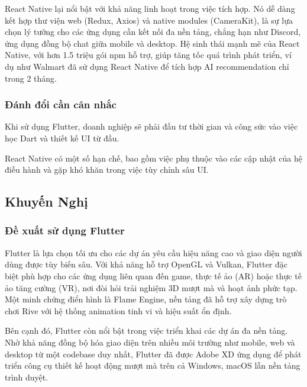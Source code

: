 \begin{flushleft}
    \hspace*{0.8cm}React Native lại nổi bật với khả năng linh hoạt trong việc tích hợp. Nó dễ dàng kết hợp thư viện web (Redux, Axios) và native modules (CameraKit), là sự lựa chọn lý tưởng cho các ứng dụng cần kết nối đa nền tảng, chẳng hạn như Discord, ứng dụng đồng bộ chat giữa mobile và desktop. Hệ sinh thái mạnh mẽ của React Native, với hơn 1.5 triệu gói npm hỗ trợ, giúp tăng tốc quá trình phát triển, ví dụ như Walmart đã sử dụng React Native để tích hợp AI recommendation chỉ trong 2 tháng.
\end{flushleft}

\subsubsection{Đánh đổi cần cân nhắc}
\begin{flushleft}
    \hspace*{0.8cm}Khi sử dụng Flutter, doanh nghiệp sẽ phải đầu tư thời gian và công sức vào việc học Dart và thiết kế UI từ đầu.
\end{flushleft}

\begin{flushleft}
    \hspace*{0.8cm}React Native có một số hạn chế, bao gồm việc phụ thuộc vào các cập nhật của hệ điều hành và gặp khó khăn trong việc tùy chỉnh sâu UI.
\end{flushleft}

\subsection{Khuyến Nghị}

\subsubsection{Đề xuất sử dụng Flutter}

\indent Flutter là lựa chọn tối ưu cho các dự án yêu cầu hiệu năng cao và giao diện người dùng được tùy biến sâu. Với khả năng hỗ trợ OpenGL và Vulkan, Flutter đặc biệt phù hợp cho các ứng dụng liên quan đến game, thực tế ảo (AR) hoặc thực tế ảo tăng cường (VR), nơi đòi hỏi trải nghiệm 3D mượt mà và hoạt ảnh phức tạp. Một minh chứng điển hình là Flame Engine, nền tảng đã hỗ trợ xây dựng trò chơi Rive với hệ thống animation tinh vi và hiệu suất ổn định.

\indent Bên cạnh đó, Flutter còn nổi bật trong việc triển khai các dự án đa nền tảng. Nhờ khả năng đồng bộ hóa giao diện trên nhiều môi trường như mobile, web và desktop từ một codebase duy nhất, Flutter đã được Adobe XD ứng dụng để phát triển công cụ thiết kế hoạt động mượt mà trên cả Windows, macOS lẫn nền tảng trình duyệt.

